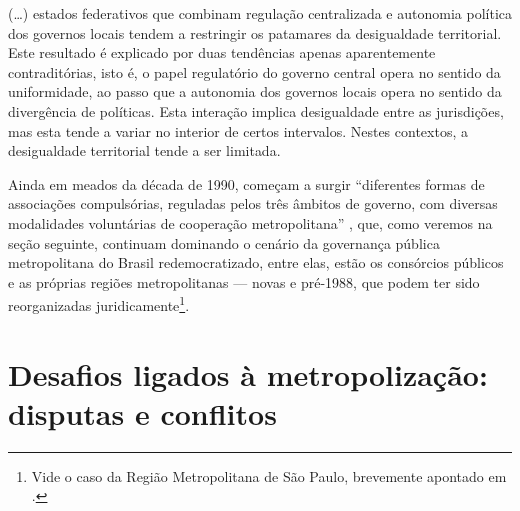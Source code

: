 \documentclass[
article,			%
11pt,				%
oneside,			%
a4paper,			%
english,			%
brazil,				%
sumario=tradicional
]{abntex2}
\begin{document}
	\begin{citacao}
		(\dots) estados federativos que combinam regulação centralizada e autonomia política dos governos locais tendem a restringir os patamares da desigualdade territorial. Este resultado é explicado por duas tendências apenas aparentemente contraditórias, isto é, o papel regulatório do governo central opera no sentido da uniformidade, ao passo que a autonomia dos governos locais opera no sentido da divergência de políticas. Esta interação implica desigualdade entre as jurisdições, mas esta tende a variar no interior de certos intervalos. Nestes contextos, a desigualdade territorial tende a ser limitada.
	\end{citacao}

	Ainda em meados da década de 1990, começam a surgir ``diferentes formas de associações compulsórias, reguladas pelos três âmbitos de governo, com diversas modalidades voluntárias de cooperação metropolitana'' \cite[p. 104]{guia2015a}, que, como veremos na seção seguinte, continuam dominando o cenário da governança pública metropolitana do Brasil redemocratizado, entre elas, estão os consórcios públicos e as próprias regiões metropolitanas --- novas e pré-1988, que podem ter sido reorganizadas juridicamente\footnote{Vide o caso da Região Metropolitana de São Paulo, brevemente apontado em .}.

	\section{Desafios ligados à metropolização: disputas e conflitos}
	
\end{document}
